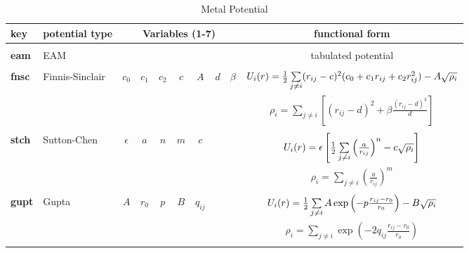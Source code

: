 \begin{table}[htbp]
\begin{centering}
\caption{\label{mettable} Metal Potential}
\vskip 5pt
\begin{tabular}{|l|l|c|c|c|c|c|c|c|c|}
\hline
key & potential type & \multicolumn{7}{c|}{Variables (1-7)}& functional form \\
\hline
           &                 &         &         &         &     &          &     &         & \\
{\bf eam}  & EAM             &         &         &         &     &          &     &         &
tabulated potential \\
           &                 &         &         &         &     &          &     &         & \\
{\bf fnsc} & Finnis-Sinclair & $c_{0}$ & $c_{1}$ & $c_{2}$ & $c$ & $A$      & $d$ & $\beta$ &
$U_{i}(r) = {1 \over 2} \sum\limits_{j \ne i} (r_{ij}-c)^{2} (c_{0}+c_{1}r_{ij}+c_{2}r_{ij}^{2}) - A \sqrt{\rho_{i}}$ \\
           &                 &         &         &         &     &          &     &         &
$\rho_{i} = \sum\limits_{j\ne i} \left[(r_{ij}-d)^{2} + \beta \frac{(r_{ij}-d)^{3}}{d}\right]$ \\
           &                 &         &         &         &     &          &     &         & \\
{\bf stch} & Sutton-Chen     & $\epsilon$ & $a$  & $n$     & $m$ & $c$      &     &         &
$U_{i}(r) = \epsilon \left[ {1 \over 2} \sum\limits_{j \ne i} \left(
\frac{a}{r_{ij}} \right)^{n} - c \sqrt{\rho_{i}} \right]$ \\
           &                 &         &         &         &     &          &     &         &
$\rho_{i} = \sum\limits_{j\ne i} \left(\frac{a}{r_{ij}}\right )^{m}$ \\
           &                 &         &         &         &     &          &     &         & \\
{\bf gupt} & Gupta           & $A$     & $r_{0}$ & $p$     & $B$ & $q_{ij}$ &     &         &
$U_{i}(r) = {1 \over 2} \sum\limits_{j \ne i} A \exp \left(-p \frac{r_{ij}-r_{0}}{r_{0}}\right) - B \sqrt{\rho_{i}}$ \\
           &                 &         &         &         &     &          &     &         &
$\rho_{i} = \sum\limits_{j\ne i} \exp \left(-2 q_{ij} \frac{r_{ij}-r_{0}}{r_{0}}\right)$ \\
           &                 &         &         &         &     &          &     &         & \\
\hline
\end{tabular}
\end{centering}
\vskip 5mm
\end{table}


